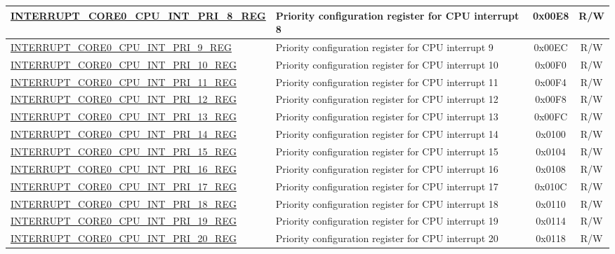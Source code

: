 \begin{longtable}{ | p{8.0cm} | p{8.4cm} | c | c| }
\hyperref[regdesc:INTERRUPTCORE0CPUINTPRI0REG]{INTERRUPT\_CORE0\_CPU\_INT\_PRI\_8\_REG} & Priority configuration register for CPU interrupt 8 & 0x00E8 & R/W \\ \hline
\hyperref[regdesc:INTERRUPTCORE0CPUINTPRI0REG]{INTERRUPT\_CORE0\_CPU\_INT\_PRI\_9\_REG} & Priority configuration register for CPU interrupt 9 & 0x00EC & R/W \\ \hline
\hyperref[regdesc:INTERRUPTCORE0CPUINTPRI0REG]{INTERRUPT\_CORE0\_CPU\_INT\_PRI\_10\_REG} & Priority configuration register for CPU interrupt 10 & 0x00F0 & R/W \\ \hline
\hyperref[regdesc:INTERRUPTCORE0CPUINTPRI0REG]{INTERRUPT\_CORE0\_CPU\_INT\_PRI\_11\_REG} & Priority configuration register for CPU interrupt 11 & 0x00F4 & R/W \\ \hline
\hyperref[regdesc:INTERRUPTCORE0CPUINTPRI0REG]{INTERRUPT\_CORE0\_CPU\_INT\_PRI\_12\_REG} & Priority configuration register for CPU interrupt 12 & 0x00F8 & R/W \\ \hline
\hyperref[regdesc:INTERRUPTCORE0CPUINTPRI0REG]{INTERRUPT\_CORE0\_CPU\_INT\_PRI\_13\_REG} & Priority configuration register for CPU interrupt 13 & 0x00FC & R/W \\ \hline
\hyperref[regdesc:INTERRUPTCORE0CPUINTPRI0REG]{INTERRUPT\_CORE0\_CPU\_INT\_PRI\_14\_REG} & Priority configuration register for CPU interrupt 14 & 0x0100 & R/W \\ \hline
\hyperref[regdesc:INTERRUPTCORE0CPUINTPRI0REG]{INTERRUPT\_CORE0\_CPU\_INT\_PRI\_15\_REG} & Priority configuration register for CPU interrupt 15 & 0x0104 & R/W \\ \hline
\hyperref[regdesc:INTERRUPTCORE0CPUINTPRI0REG]{INTERRUPT\_CORE0\_CPU\_INT\_PRI\_16\_REG} & Priority configuration register for CPU interrupt 16 & 0x0108 & R/W \\ \hline
\hyperref[regdesc:INTERRUPTCORE0CPUINTPRI0REG]{INTERRUPT\_CORE0\_CPU\_INT\_PRI\_17\_REG} & Priority configuration register for CPU interrupt 17 & 0x010C & R/W \\ \hline
\hyperref[regdesc:INTERRUPTCORE0CPUINTPRI0REG]{INTERRUPT\_CORE0\_CPU\_INT\_PRI\_18\_REG} & Priority configuration register for CPU interrupt 18 & 0x0110 & R/W \\ \hline
\hyperref[regdesc:INTERRUPTCORE0CPUINTPRI0REG]{INTERRUPT\_CORE0\_CPU\_INT\_PRI\_19\_REG} & Priority configuration register for CPU interrupt 19 & 0x0114 & R/W \\ \hline
\hyperref[regdesc:INTERRUPTCORE0CPUINTPRI0REG]{INTERRUPT\_CORE0\_CPU\_INT\_PRI\_20\_REG} & Priority configuration register for CPU interrupt 20 & 0x0118 & R/W \\ \hline

\end{longtable}
